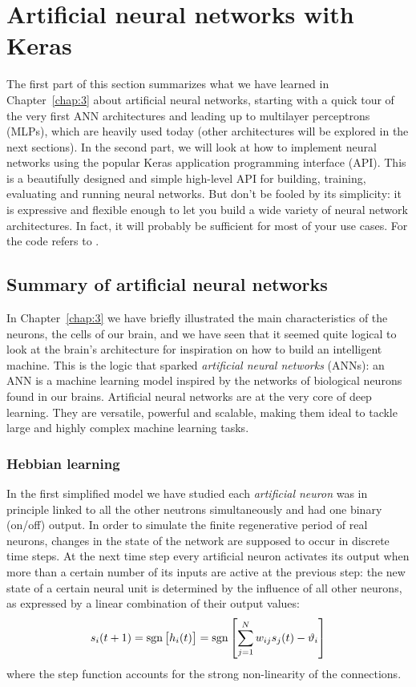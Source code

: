 \section{Artificial neural networks with Keras}
The first part of this section summarizes what we have learned in Chapter~\ref{chap:3} about artificial neural networks, starting with a quick tour of the very first ANN architectures and leading up to multilayer perceptrons (MLPs), which are heavily used today (other architectures will be explored in the next sections). In the second part, we will look at how to implement neural networks using the popular Keras application programming interface (API). This is a beautifully designed and simple high-level API for building, training, evaluating and running neural networks. But don't be fooled by its simplicity: it is expressive and flexible enough to let you build a wide variety of neural network architectures. In fact, it will probably be sufficient for most of your use cases. For the code refers to .
\subsection{Summary of artificial neural networks}\label{subsec:Summary}
In Chapter~\ref{chap:3} we have briefly illustrated the main characteristics of the neurons, the cells of our brain, and we have seen that it seemed quite logical to look at the brain's architecture for inspiration on how to build an intelligent machine. This is the logic that sparked \emph{artificial neural networks} (ANNs): an ANN is a machine learning model inspired by the networks of biological neurons found in our brains. Artificial neural networks are at the very core of deep learning. They are versatile, powerful and scalable, making them ideal to tackle large and highly complex machine learning tasks.

\subsubsection*{Hebbian learning}
In the first simplified model we have studied each \emph{artificial neuron} was in principle linked to all the other neutrons simultaneously and had one binary (on/off) output. In order to simulate the finite regenerative period of real neurons, changes in the state of the network are supposed to occur in discrete time steps. At the next time step every artificial neuron activates its output when more than a certain number of its inputs are active at the previous step: the new state of a certain neural unit is determined by the influence of all other neurons, as expressed by a linear combination of their output values:
\begin{equation}
s_i(t+1)=\operatorname{sgn}{\bigl[h_i(t)\bigr]}=\operatorname{sgn}{\left[\sum_{j=1}^Nw_{ij}s_j(t)-\vartheta_i\right]}
\end{equation}
where the step function accounts for the strong non-linearity of the connections.

